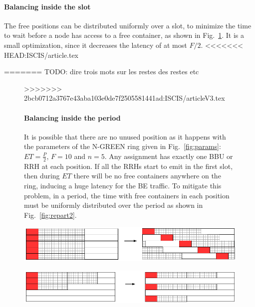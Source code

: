 \documentclass[10pt, conference, letterpaper]{IEEEtran}
\newcommand{\todo}[1]{{\color{red} TODO: {#1}}}
\begin{document}
\paragraph{Balancing inside the slot}

The free positions can be distributed uniformly over a slot, to minimize the time to wait before a node 
has access to a free container, as shown in Fig.~\ref{fig:repart1}. It is a small optimization, since 
it decreases the latency of at most $F/2$.
<<<<<<< HEAD:ISCIS/article.tex

=======
\todo{dire trois mots sur les restes des restes etc}
\begin{figure}[h!]
\begin{center}   
>>>>>>> 2bcb0712a3767e43aba103e0de7f2505581441ad:ISCIS/articleV3.tex

\paragraph{Balancing inside the period}

It is possible that there are no unused position as it happens with the parameters of the N-GREEN ring given in Fig.~\ref{fig:params}: $ET = \frac{P}{2}$, $F = 10$ and $n = 5$. Any assignment has exactly one  BBU or RRH at each position. If all the RRHs start to emit in the first slot, then during $ET$ there will be no free containers anywhere on the ring, inducing a huge latency for the BE traffic. 
To mitigate this problem, in a period, the time with free containers in each position must be uniformly distributed over the period as shown in Fig.~\ref{fig:repart2}.

     \begin{minipage}[b]{0.5\linewidth}
        \begin{center}
      \includegraphics[scale=0.55]{repart2}
            
          \label{fig:repart1}
      \end{center} 
  \end{minipage}
    \begin{minipage}[b]{0.5\linewidth}
        \begin{center}
      \includegraphics[scale=0.55]{repart1}
      

\end{center}
\end{minipage}
\end{center}
\end{figure}
\end{document}
